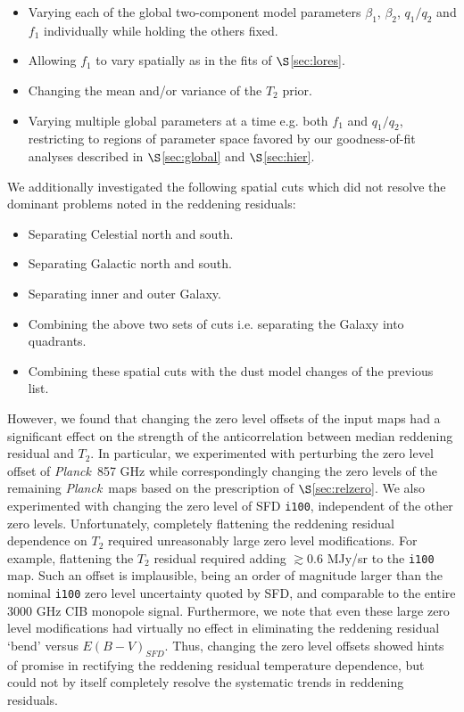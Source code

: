 \documentclass{emulateapj}
\newcommand{\PLANCK}{{\it Planck}}
\begin{document}
\begin{itemize}
\item Varying each of the global two-component model parameters $\beta_1$, 
$\beta_2$, $q_1/q_2$ and $f_1$ individually while holding the others fixed.
\vspace{-3mm}
\item Allowing $f_1$ to vary spatially as in the fits of $\S$\ref{sec:lores}.
\vspace{-2mm}
\item Changing the mean and/or variance of the $T_2$ prior.
\vspace{-6mm}
\item Varying multiple global parameters at a time e.g. both $f_1$ and 
$q_1/q_2$, restricting to regions of parameter space favored by our 
goodness-of-fit analyses described in $\S$\ref{sec:global} and 
$\S$\ref{sec:hier}.
\end{itemize}

We additionally investigated the following spatial cuts which did not resolve 
the dominant problems noted in the reddening residuals:
\begin{itemize}
\item Separating Celestial north and south.
\vspace{-3mm}
\item Separating Galactic north and south.
\vspace{-3mm}
\item Separating inner and outer Galaxy.
\vspace{-3mm}
\item Combining the above two sets of cuts i.e. separating the Galaxy into
quadrants. 
\vspace{-3mm}
\item Combining these spatial cuts with the dust model changes of the previous
list.
\end{itemize}

However, we found that changing the zero level offsets of the input maps 
had a significant effect on the strength of the anticorrelation between median 
reddening residual and $T_2$. In particular, we experimented with perturbing 
the zero level offset of \PLANCK~857 GHz while correspondingly changing the 
zero levels of the remaining \PLANCK~maps based on the prescription of 
$\S$\ref{sec:relzero}. We also experimented with changing the zero level of SFD
\verb|i100|, independent of the other zero levels. Unfortunately, completely
flattening the reddening residual dependence on $T_2$ required unreasonably 
large zero level modifications. For example, flattening the $T_2$ residual 
required adding $\gtrsim$0.6 MJy/sr to the \verb|i100| map. Such an offset is 
implausible, being an order of magnitude larger than the nominal \verb|i100| 
zero level uncertainty quoted by SFD, and comparable to the entire 3000 GHz CIB
monopole signal. Furthermore, we note that even these large zero level 
modifications had virtually no effect in eliminating the reddening residual 
`bend' versus $E(B-V)_{SFD}$. Thus, changing the zero level offsets showed 
hints of promise in rectifying the reddening residual temperature dependence, 
but could not by itself completely resolve the systematic trends in reddening 
residuals.
\end{document}
